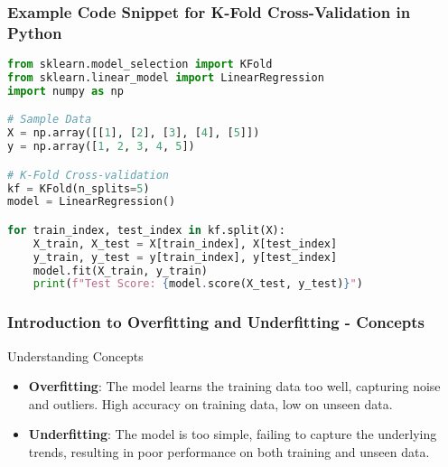 \documentclass[aspectratio=169]{beamer}
\begin{document}
\begin{frame}[fragile]
    \frametitle{Example Code Snippet for K-Fold Cross-Validation in Python}
    \begin{lstlisting}[language=Python]
from sklearn.model_selection import KFold
from sklearn.linear_model import LinearRegression
import numpy as np

# Sample Data
X = np.array([[1], [2], [3], [4], [5]])
y = np.array([1, 2, 3, 4, 5])

# K-Fold Cross-validation
kf = KFold(n_splits=5)
model = LinearRegression()

for train_index, test_index in kf.split(X):
    X_train, X_test = X[train_index], X[test_index]
    y_train, y_test = y[train_index], y[test_index]
    model.fit(X_train, y_train)
    print(f"Test Score: {model.score(X_test, y_test)}")
    \end{lstlisting}
\end{frame}

\begin{frame}[fragile]
    \frametitle{Introduction to Overfitting and Underfitting - Concepts}
    \begin{block}{Understanding Concepts}
        \begin{itemize}
            \item \textbf{Overfitting}: The model learns the training data too well, capturing noise and outliers. High accuracy on training data, low on unseen data.
            \item \textbf{Underfitting}: The model is too simple, failing to capture the underlying trends, resulting in poor performance on both training and unseen data.
        \end{itemize}
    \end{block}
\end{frame}
\end{document}
